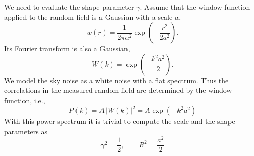 \documentclass[twocolumn]{emulateapj}
\begin{document}
We need to evaluate the shape parameter $\gamma$. Assume that the window 
function applied to the random field is a Gaussian with a scale $a$,
\begin{equation}
	w(r) = \frac{1}{2\pi a^2} \exp\left(-\frac{r^2}{2 a^2}\right).
\end{equation}
Its Fourier transform is also a Gaussian,
\begin{equation}
	W(k) = \exp\left(-\frac{k^2a^2}{2}\right).
\end{equation}
We model the sky noise as a white noise with a flat spectrum. Thus the
correlations in the measured random field are determined by the window function,
i.e.,
\begin{equation}
	P(k) = A\,|W(k)|^2 = A \exp\left(-k^2a^2\right)
\end{equation}
With this power spectrum it is trivial to compute the scale and the shape 
parameters as
\begin{equation}
	\gamma^2 = \frac{1}{2}, \qquad R^2 = \frac{a^2}{2}
\end{equation}
\end{document}
